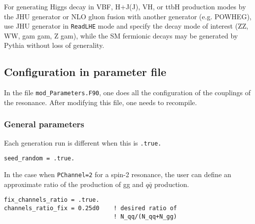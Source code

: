 \documentclass[aps,superscriptaddress,nofootinbib]{revtex4}
\begin{document}

\noindent
For generating Higgs decay in VBF, H+J(J), VH, or ttbH production
modes by the JHU generator or NLO gluon fusion with another generator (e.g. POWHEG), use JHU generator in \verb|ReadLHE|
mode and specify the decay mode of interest (ZZ, WW, gam gam, Z gam), while the SM fermionic decays
may be generated by Pythia without loss of generality.

\subsection{ Configuration in parameter file  }

In the file \verb|mod_Parameters.F90|, one does all the configuration of the couplings of the resonance.
After modifying this file, one needs to recompile.

\subsubsection{ General parameters }

\noindent
Each generation run is different when this is \verb|.true.|

\begin{verbatim}
seed_random = .true.
\end{verbatim}

\noindent
In the case when \verb|PChannel=2| for a spin-2 resonance, the user can define an approximate ratio of the production of gg and $q\bar{q}$ production.

\begin{verbatim}
fix_channels_ratio = .true.
channels_ratio_fix = 0.25d0    ! desired ratio of
                               ! N_qq/(N_qq+N_gg)
\end{verbatim}
\end{document}
